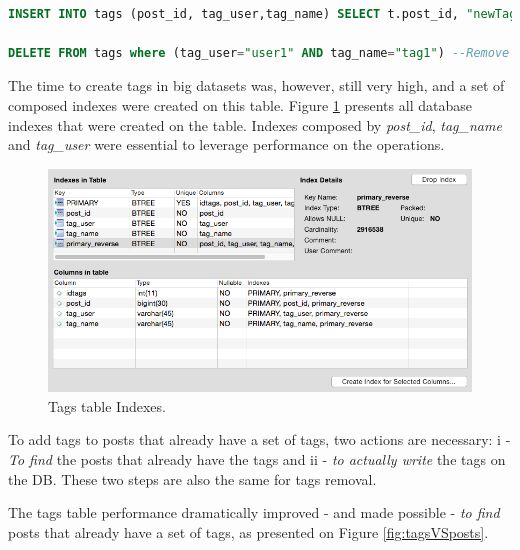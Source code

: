 \begin{lstlisting}[language=SQL,firstnumber=1, caption=New SQL queries to add and remove tags, label=new-sql-queries]

INSERT INTO tags (post_id, tag_user,tag_name) SELECT t.post_id, "newTagUser", "newTagName" from tags t where (t.tag_user= "user1" and t.tag_name="tag1") OR (t.tag_user="user2" and t.tag_name="tag2") -- Create tags 

DELETE FROM tags where (tag_user="user1" AND tag_name="tag1") --Remove Tags

\end{lstlisting} 


The time to create tags in big datasets was, however, still very high, and a set of composed indexes were created on this table. Figure \ref{fig:tagsIndexes} presents all database indexes that were created on the table. Indexes composed by \textit{post\_id}, \textit{tag\_name} and \textit{tag\_user} were essential to leverage performance on the operations. 

\begin{figure}[ht!]
\centering
\includegraphics[width=120mm]{Imagens/tagsIndexes.png}
\caption{Tags table Indexes. \label{fig:tagsIndexes}}
\end{figure}

To add tags to posts that already have a set of tags, two actions are necessary: i - \textit{To find} the posts that already have the tags and ii - \textit{to actually write} the tags on the DB. These two steps are also the same for tags removal.

The tags table performance dramatically improved - and made possible - \textit{ to find} posts that already have a set of tags, as presented on Figure \ref{fig:tagsVSposts}.

